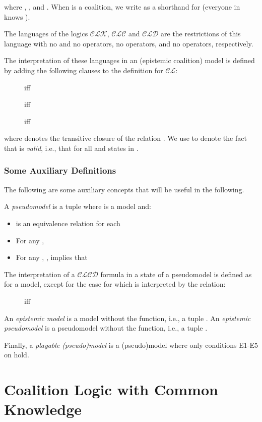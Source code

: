 \documentclass{article}
\newcommand{\acro}[1]{\ensuremath{\mathcal{#1}}}
\begin{document}
where , ,  and
. When  is a coalition, we
write  as a shorthand for 
(everyone in  knows ).

The languages of the logics \acro{CLK}, \acro{CLC} and \acro{CLD} are
the restrictions of this language with no  and no 
operators, no  operators, and no  operators, respectively.

The interpretation of these languages in an (epistemic coalition)
model  is defined by adding the following clauses to the definition
for \acro{CL}:
\begin{description}
\item[]  iff 
\item[]  iff 
\item[]  iff 
\end{description}
where  denotes the transitive closure of the relation .  We
use  to denote the fact that  is \emph{valid},
i.e., that  for all  and states  in .

\subsubsection{Some Auxiliary Definitions}

The following are some auxiliary concepts that will be useful in the
following.

A \emph{pseudomodel} is a tuple  where  is a model and:
\begin{itemize}
\item  is an equivalence relation for each 
\item For any , 
\item For any , ,  implies that 
\end{itemize}
The interpretation of a \acro{CLCD} formula in a state of a
pseudomodel is defined as for a model, except for the case for 
which is interpreted by the  relation:
\begin{description}
\item[]  iff 
\end{description}

An \emph{epistemic model} is a model without the  function, i.e., a
tuple . An \emph{epistemic
  pseudomodel} is a pseudomodel without the  function, i.e., a
tuple .

Finally, a \emph{playable (pseudo)model} is a (pseudo)model where only 
conditions E1-E5 on  hold.


\section{Coalition Logic with Common Knowledge}
\label{sec:clc}
\end{document}
